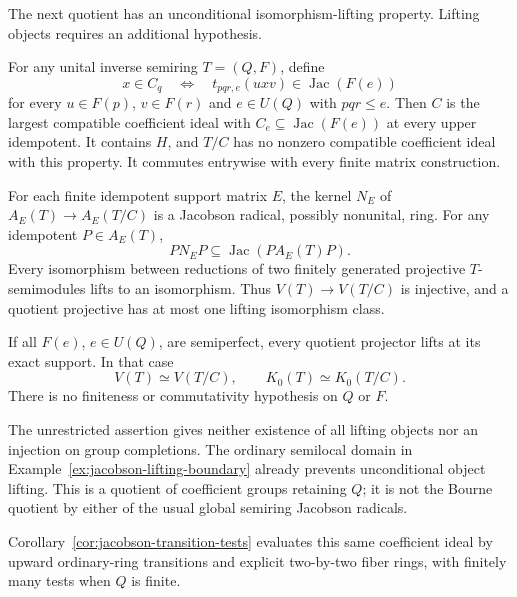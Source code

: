 The next quotient has an unconditional isomorphism-lifting property.
Lifting objects requires an additional hypothesis.

\begin{theorem}
\label{thm:upper-jacobson-quotient}
For any unital inverse semiring $T=(Q,F)$, define
\[
 x\in C_q\quad\Longleftrightarrow\quad
 t_{pqr,e}(uxv)\in\operatorname{Jac}(F(e))
\]
for every $u\in F(p)$, $v\in F(r)$ and $e\in U(Q)$ with
$pqr\leq e$. Then $C$ is the largest compatible coefficient ideal
with $C_e\subseteq\operatorname{Jac}(F(e))$ at every upper
idempotent. It contains $H$, and $T/C$ has no nonzero compatible
coefficient ideal with this property. It commutes entrywise with
every finite matrix construction.

For each finite idempotent support matrix $E$, the kernel $N_E$ of
$A_E(T)\to A_E(T/C)$ is a Jacobson radical, possibly nonunital,
ring. For any idempotent $P\in A_E(T)$,
\[
 P N_E P\subseteq\operatorname{Jac}(P A_E(T)P).
\]
Every isomorphism between reductions of two finitely generated
projective $T$-semimodules lifts to an isomorphism. Thus
$V(T)\to V(T/C)$ is injective, and a quotient projective has at
most one lifting isomorphism class.

If all $F(e)$, $e\in U(Q)$, are semiperfect, every quotient
projector lifts at its exact support. In that case
\[
 V(T)\simeq V(T/C),\qquad K_0(T)\simeq K_0(T/C).
\]
There is no finiteness or commutativity hypothesis on $Q$ or $F$.
\end{theorem}

The unrestricted assertion gives neither existence of all lifting
objects nor an injection on group completions. The ordinary
semilocal domain in Example~\ref{ex:jacobson-lifting-boundary}
already prevents unconditional object lifting. This is a quotient
of coefficient groups retaining $Q$; it is not the Bourne
quotient by either of the usual global semiring Jacobson radicals.


Corollary~\ref{cor:jacobson-transition-tests} evaluates this same
coefficient ideal by upward ordinary-ring transitions and explicit
two-by-two fiber rings, with finitely many tests when $Q$ is finite.
